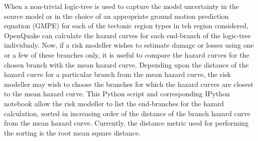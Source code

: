 When a non-trivial logic-tree is used to capture the model uncertainty in the source model or in the choice of an appropriate ground motion prediction equation (GMPE) for each of the tectonic region types in teh region considered, OpenQuake can calculate the hazard curves for each end-branch of the logic-tree individualy. Now, if a risk modeller wishes to estimate damage or losses using one or a few of these branches only, it is useful to compare the hazard curves for the chosen branch with the mean hazard curve. Depending upon the distance of the hazard curve for a particular branch from the mean hazard curve, the risk modeller may wish to choose the branches for which the hazard curves are closest to the mean hazard curve. This Python script and corresponding IPython notebook allow the risk modeller to list the end-branches for the hazard calculation, sorted in increasing order of the distance of the branch hazard curve from the mean hazard curve. Currently, the distance metric used for performing the sorting is the root mean square distance.